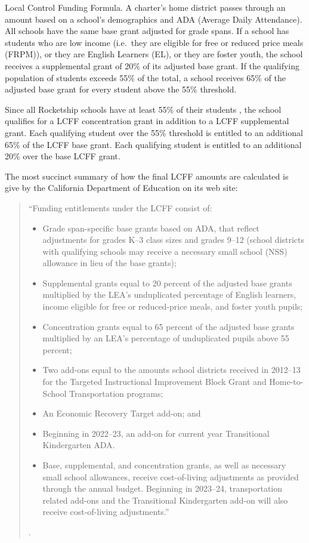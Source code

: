 \begin{description}[nosep]\OnehalfSpacing%
  \medskip\item[LCFF] Local Control Funding Formula. A charter's home district passes through an amount based on a school's demographics and ADA (Average Daily Attendance). All schools have the same base grant adjusted for grade spans.  If a school has students who are low income (i.e.~they are eligible for free or reduced price meals (FRPM)), or they are English Learners (EL), or they are foster youth, the school receives a supplemental grant of 20\% of its adjusted base grant. If the qualifying population of students exceeds 55\% of the total, a school receives 65\% of the adjusted base grant for every student above the 55\% threshold.

Since all Rocketship schools have at least 55\% of their students , the school qualifies for a LCFF concentration grant in addition to a LCFF supplemental grant. Each qualifying student over the 55\% threshold is entitled to an additional 65\% of the LCFF base grant. Each qualifying student is entitled to an additional 20\% over the base LCFF grant. 

The most succinct summary of how the final LCFF amounts are calculated is give by the California Department of Education on its web site:

\begin{quotation}
  \noindent{}``Funding entitlements under the LCFF consist of:\\
  \begin{itemize}
    \item Grade span-specific base grants based on ADA, that reflect adjustments for grades K–3 class sizes and grades 9–12 (school districts with qualifying schools may receive a necessary small school (NSS) allowance in lieu of the base grants);
    \item Supplemental grants equal to 20 percent of the adjusted base grants multiplied by the LEA’s unduplicated percentage of English learners, income eligible for free or reduced-price meals, and foster youth pupils;
    \item Concentration grants equal to 65 percent of the adjusted base grants multiplied by an LEA’s percentage of unduplicated pupils above 55 percent;
    \item Two add-ons equal to the amounts school districts received in 2012–13 for the Targeted Instructional Improvement Block Grant and Home-to-School Transportation programs;
    \item An Economic Recovery Target add-on; and
    \item Beginning in 2022–23, an add-on for current year Transitional Kindergarten ADA.
    \item Base, supplemental, and concentration grants, as well as necessary small school allowances, receive cost-of-living adjustments as provided through the annual budget. Beginning in 2023–24, transportation related add-ons and the Transitional Kindergarten add-on will also receive cost-of-living adjustments.''
  \end{itemize}
  .
\end{quotation}


\end{description}

